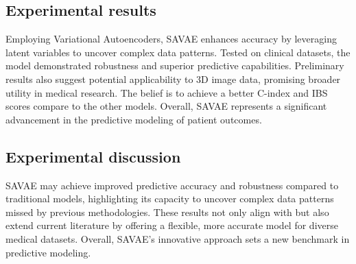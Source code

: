 \documentclass{article}
\begin{document}
\subsection{Experimental results}

Employing Variational Autoencoders, SAVAE enhances accuracy by leveraging latent variables to uncover complex data patterns. Tested on clinical datasets, the model demonstrated robustness and superior predictive capabilities. Preliminary results also suggest potential applicability to 3D image data, promising broader utility in medical research. The belief is to achieve a better C-index and IBS scores compare to the other models. Overall, SAVAE represents a significant advancement in the predictive modeling of patient outcomes.

\subsection{Experimental discussion}
SAVAE may achieve improved predictive accuracy and robustness compared to traditional models, highlighting its capacity to uncover complex data patterns missed by previous methodologies.  These results not only align with but also extend current literature by offering a flexible, more accurate model for diverse medical datasets. Overall, SAVAE's innovative approach sets a new benchmark in predictive modeling.



  

\cleardoublepage
\end{document}
